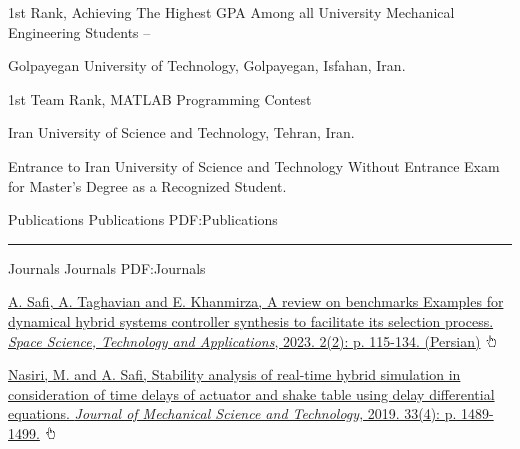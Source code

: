 \documentclass[letterpaper,MMMyyyy]{ResumeTemplate}
\begin{document}
\begin{Body}
\Gap
\vspace{5pt}
\BulletItem
1st Rank, Achieving The Highest GPA Among all University Mechanical Engineering Students
\hfill
\textcolor{OrangeY}{ -- }
\begin{Detail}
	\Item
	Golpayegan University of Technology, Golpayegan, Isfahan, Iran.
\end{Detail}

\Gap
\vspace{5pt}
\BulletItem
1st Team Rank, MATLAB Programming Contest
\hfill
\textcolor{OrangeY}{}
\begin{Detail}
\Item
Iran University of Science and Technology, Tehran, Iran.
\end{Detail}

\Gap
\vspace{5pt}
\BulletItem
Entrance to Iran University of Science and Technology Without Entrance Exam for Master's Degree as a Recognized Student.
\hfill
\textcolor{OrangeY}{}




\Section
{Publications}
{Publications}
{PDF:Publications}
\textcolor{Forestg}{\vspace{0.05cm}\hrule height 0.1cm}\BigGap
\SubSection
{Journals}
{Journals}
{PDF:Journals}

\begingroup
\renewcommand{\MaxNumberedItem}{[88]}

\BigGap
\NumberedItem{[1]}
\href{https://journal.isrc.ac.ir/article_164991.html?lang=en}
{\underline{A. Safi}, A. Taghavian and E. Khanmirza, A review on benchmarks Examples for dynamical hybrid systems controller synthesis to facilitate its selection process. \textit{Space Science, Technology and Applications}, 2023. 2(2): p. 115-134. (Persian)}
\includegraphics[height=9pt]{icons/hand-cursor.png}

\Gap\vspace{5pt}
\NumberedItem{[2]}
\href{https://link.springer.com/article/10.1007/s12206-019-0301-6}
{Nasiri, M. and \underline{A. Safi}, Stability analysis of real-time hybrid simulation in consideration of time delays of actuator and shake table using delay differential equations. \textit{Journal of Mechanical Science and Technology}, 2019. 33(4): p. 1489-1499.} \includegraphics[height=9pt]{icons/hand-cursor.png}


\end{Body}
\end{document}
